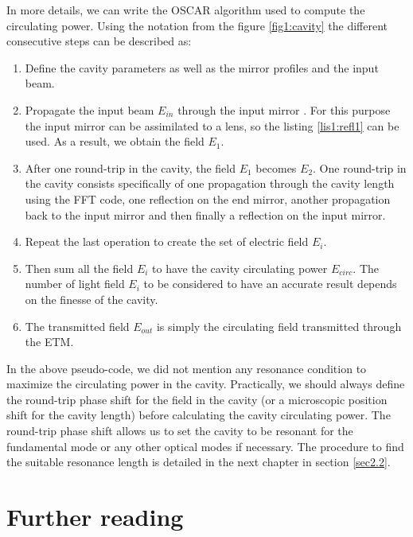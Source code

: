 In more details, we can write the OSCAR algorithm used to compute the circulating power. Using the notation from the figure \ref{fig1:cavity} the different consecutive steps can be described as:

\begin{enumerate}
  \item Define the cavity parameters as well as the mirror profiles and the input beam.
  \item Propagate the input beam $E_{in}$ through the input mirror . For this purpose the input mirror can be assimilated to a lens, so the listing \ref{lis1:refl1} can be used. As a result, we obtain the field $E_1$.
  \item After one round-trip in the cavity, the field $E_1$ becomes $E_2$. One round-trip in the cavity consists specifically of one propagation through the cavity length using the FFT code, one reflection on the end mirror, another propagation back to the input mirror and then finally a reflection on the input mirror.
  \item Repeat the last operation to create the set of electric field $E_i$.
  \item Then sum all the field $E_i$ to have the cavity circulating power $E_{circ}$. The number of light field $E_i$ to be considered to have an accurate result depends on the finesse of the cavity.
  \item The transmitted field $E_{out}$ is simply the circulating field transmitted through the ETM.
\end{enumerate}

In the above pseudo-code, we did not mention any resonance condition to maximize the circulating power in the cavity. Practically, we should always define the round-trip phase shift for the field in the cavity (or a microscopic position shift for the cavity length) before calculating the cavity circulating power. The round-trip phase shift allows us to set the cavity to be resonant for the fundamental mode or any other optical modes if necessary. The procedure to find the suitable resonance length is detailed in the next chapter in section \ref{sec2.2}.

\section{Further reading}

